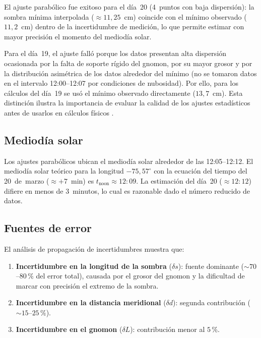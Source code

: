 \documentclass[12pt,a4paper]{article}
\begin{document}
El ajuste parabólico fue exitoso para el día~20 (4~puntos con baja
dispersión): la sombra mínima interpolada ($\approx 11{,}25$~cm)
coincide con el mínimo observado ($11{,}2$~cm) dentro de la
incertidumbre de medición, lo que permite estimar con mayor precisión
el momento del mediodía solar.

Para el día~19, el ajuste falló porque los datos presentan alta
dispersión ocasionada por la falta de soporte rígido del gnomon, por
su mayor grosor y por la distribución asimétrica de los datos
alrededor del mínimo (no se tomaron datos en el intervalo 12:00--12:07
por condiciones de nubosidad).
Por ello, para los cálculos del día~19 se usó el mínimo observado
directamente ($13{,}7$~cm).
Esta distinción ilustra la importancia de evaluar la calidad de los
ajustes estadísticos antes de usarlos en cálculos físicos
\citep{Baird1991}.

\subsection{Mediodía solar}

Los ajustes parabólicos ubican el mediodía solar alrededor de las
12:05--12:12.
El mediodía solar teórico para la longitud $-75{,}57^\circ$ con la ecuación
del tiempo del 20~de~marzo ($\approx +7$~min) es
$t_\text{noon} \approx 12{:}09$.
La estimación del día~20 ($\approx 12{:}12$) difiere en menos de
3~minutos, lo cual es razonable dado el número reducido de datos.

\subsection{Fuentes de error}

El análisis de propagación de incertidumbres muestra que:

\begin{enumerate}
  \item \textbf{Incertidumbre en la longitud de la sombra} ($\delta s$):
        fuente dominante ($\sim 70$--$80\,\%$ del error total), causada
        por el grosor del gnomon y la dificultad de marcar con precisión
        el extremo de la sombra.
  \item \textbf{Incertidumbre en la distancia meridional} ($\delta d$):
        segunda contribución ($\sim 15$--$25\,\%$).
  \item \textbf{Incertidumbre en el gnomon} ($\delta L$): contribución
        menor al $5\,\%$.
\end{enumerate}
\end{document}
